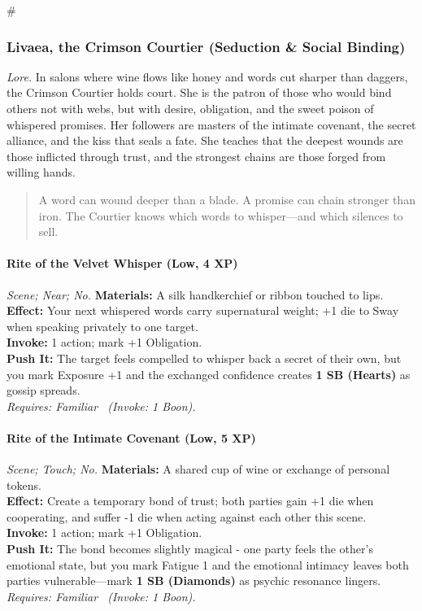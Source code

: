 # %

\subsubsection{Livaea, the Crimson Courtier (Seduction \& Social Binding)}
\textit{Lore.} In salons where wine flows like honey and words cut sharper than daggers, the Crimson Courtier holds court. She is the patron of those who would bind others not with webs, but with desire, obligation, and the sweet poison of whispered promises. Her followers are masters of the intimate covenant, the secret alliance, and the kiss that seals a fate. She teaches that the deepest wounds are those inflicted through trust, and the strongest chains are those forged from willing hands.

\begin{quote}
A word can wound deeper than a blade. A promise can chain stronger than iron. The Courtier knows which words to whisper—and which silences to sell.
\end{quote}

\paragraph*{Rite of the Velvet Whisper (Low, 4 XP)} \emph{Scene; Near; No.}
\textbf{Materials:} A silk handkerchief or ribbon touched to lips. \\
\textbf{Effect:} Your next whispered words carry supernatural weight; +1 die to Sway when speaking privately to one target. \\
\textbf{Invoke:} 1 action; mark +1 Obligation. \\
\textbf{Push It:} The target feels compelled to whisper back a secret of their own, but you mark Exposure +1 and the exchanged confidence creates \textbf{1 SB (Hearts)} as gossip spreads. \\
\emph{Requires: Familiar \ (\textit{Invoke:} 1 Boon).}

\paragraph*{Rite of the Intimate Covenant (Low, 5 XP)} \emph{Scene; Touch; No.}
\textbf{Materials:} A shared cup of wine or exchange of personal tokens. \\
\textbf{Effect:} Create a temporary bond of trust; both parties gain +1 die when cooperating, and suffer -1 die when acting against each other this scene. \\
\textbf{Invoke:} 1 action; mark +1 Obligation. \\
\textbf{Push It:} The bond becomes slightly magical - one party feels the other's emotional state, but you mark Fatigue 1 and the emotional intimacy leaves both parties vulnerable—mark \textbf{1 SB (Diamonds)} as psychic resonance lingers. \\
\emph{Requires: Familiar \ (\textit{Invoke:} 1 Boon).}

